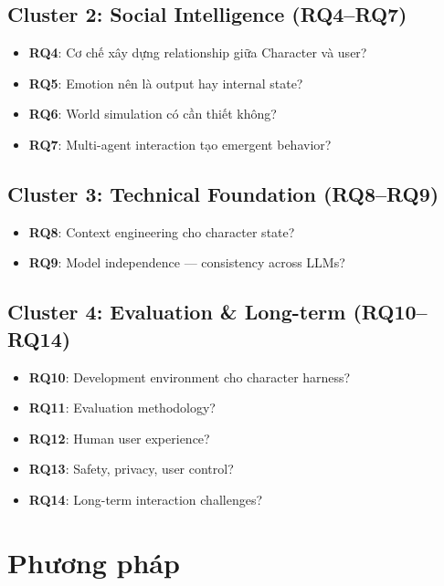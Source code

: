 \documentclass[10pt,leqno]{amsart}
\begin{document}
\subsection{Cluster 2: Social Intelligence (RQ4--RQ7)}
\begin{itemize}
    \item \textbf{RQ4}: Cơ chế xây dựng relationship giữa Character và user?
    \item \textbf{RQ5}: Emotion nên là output hay internal state?
    \item \textbf{RQ6}: World simulation có cần thiết không?
    \item \textbf{RQ7}: Multi-agent interaction tạo emergent behavior?
\end{itemize}

\subsection{Cluster 3: Technical Foundation (RQ8--RQ9)}
\begin{itemize}
    \item \textbf{RQ8}: Context engineering cho character state?
    \item \textbf{RQ9}: Model independence --- consistency across LLMs?
\end{itemize}

\subsection{Cluster 4: Evaluation \& Long-term (RQ10--RQ14)}
\begin{itemize}
    \item \textbf{RQ10}: Development environment cho character harness?
    \item \textbf{RQ11}: Evaluation methodology?
    \item \textbf{RQ12}: Human user experience?
    \item \textbf{RQ13}: Safety, privacy, user control?
    \item \textbf{RQ14}: Long-term interaction challenges?
\end{itemize}


\section{Phương pháp}
\end{document}
